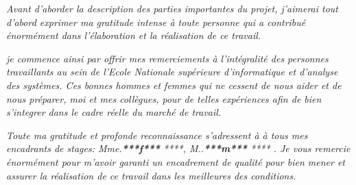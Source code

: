 \documentclass[a4paper]{report}
\begin{document}
\begin{doublespace}
    \begin{center}

        \textit{Avant d'aborder la description des parties importantes du projet, j'aimerai tout d’abord exprimer ma gratitude intense à toute personne qui a contribué énormément dans l'élaboration et la réalisation de ce travail.}

        \textit{je commence ainsi par offrir mes remerciements à l'intégralité des personnes travaillants au sein de l’Ecole Nationale supérieure d’informatique et d’analyse des systèmes. Ces bonnes hommes et femmes qui ne cessent de nous aider et de nous préparer, moi et mes collègues, pour de telles expériences afin de bien s'integrer dans le cadre réelle du marché de travail.}

        \textit{Toute ma gratitude et profonde reconnaissance s’adressent à à tous mes encadrants de stages: Mme.\textbf{***f***} ****, M..\textbf{***m***} ****   . Je vous remercie énormément pour m'avoir garanti un encadrement de qualité pour bien mener et assurer la réalisation de ce travail dans les meilleures des conditions.}

    \end{center}

\end{doublespace}
\end{document}
